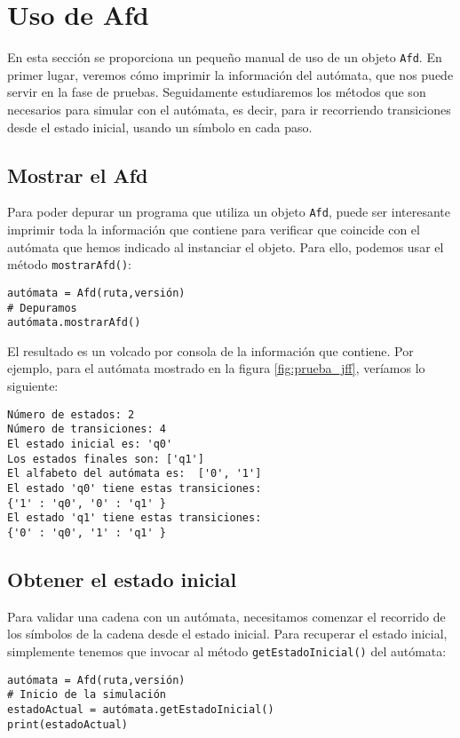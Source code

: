\section{Uso de Afd}

En esta sección se proporciona un pequeño manual de uso de un objeto \texttt{Afd}. En primer lugar, veremos cómo imprimir la información del autómata, que nos puede servir en la fase de pruebas. Seguidamente estudiaremos los métodos que son necesarios para simular con el autómata, es decir, para ir recorriendo transiciones desde el estado inicial, usando un símbolo en cada paso.

\subsection{Mostrar el Afd}

Para poder depurar un programa que utiliza un objeto \texttt{Afd}, puede ser interesante imprimir toda la información que contiene para verificar que coincide con el autómata que hemos indicado al instanciar el objeto. Para ello, podemos usar el método \texttt{mostrarAfd()}:

\begin{lstlisting}
autómata = Afd(ruta,versión)
# Depuramos
autómata.mostrarAfd()
\end{lstlisting}

El resultado es un volcado por consola de la información que contiene. Por ejemplo, para el autómata mostrado en la figura \ref{fig:prueba_jff}, veríamos lo siguiente:

\begin{lstlisting}
Número de estados: 2
Número de transiciones: 4
El estado inicial es: 'q0'
Los estados finales son: ['q1']
El alfabeto del autómata es:  ['0', '1']
El estado 'q0' tiene estas transiciones:
{'1' : 'q0', '0' : 'q1' }
El estado 'q1' tiene estas transiciones:
{'0' : 'q0', '1' : 'q1' }
\end{lstlisting}

\subsection{Obtener el estado inicial}

Para validar una cadena con un autómata, necesitamos comenzar el recorrido de los símbolos de la cadena desde el estado inicial. Para recuperar el estado inicial, simplemente tenemos que invocar al método \texttt{getEstadoInicial()} del autómata:

\begin{lstlisting}
autómata = Afd(ruta,versión)
# Inicio de la simulación
estadoActual = autómata.getEstadoInicial()
print(estadoActual)
\end{lstlisting}

